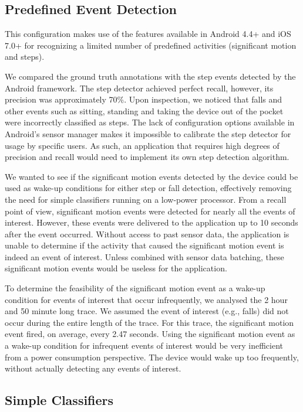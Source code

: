 \subsection{Predefined Event Detection} 

This configuration makes use of the features available in Android 4.4+ and iOS 
7.0+ for recognizing a limited number of predefined activities (significant motion 
and steps). 

We compared the ground truth annotations with the step events detected by the Android framework. 
The step detector achieved perfect recall, however, its precision was approximately
70\%. Upon inspection, we noticed that falls and other events such as sitting, standing and taking the
device out of the pocket were incorrectly classified as steps. The lack of configuration options available
in Android's sensor manager makes it impossible to calibrate the step detector for usage by specific users. 
As such, an application that requires high degrees of precision and recall would need to implement its own
step detection algorithm.

We wanted to see if the significant motion events detected by the device could be used as wake-up 
conditions for either step or fall detection, effectively removing the need for simple classifiers running
on a low-power processor.  From a recall point of view, significant motion
events were detected for nearly all the events of interest.  However, these events were delivered to the
application up to 10 seconds after the event occurred.  Without access to past sensor data, the
application is unable to determine if the activity that caused the significant motion event is indeed 
an event of interest.  Unless combined with sensor data batching, these
significant motion events would be useless for the application. 

To determine the feasibility of the significant motion event as a wake-up condition for events of
interest that occur infrequently, we analysed the 2 hour and 50 minute long trace. We assumed the event of interest
(e.g., falls) did not occur during the entire length of the trace. For this trace, the significant motion event
fired, on average, every 2.47 seconds. Using the significant motion event as a wake-up condition for infrequent
events of interest would be very inefficient from a power consumption perspective. The device would wake up too
frequently, without actually detecting any events of interest.

\subsection{Simple Classifiers} 

